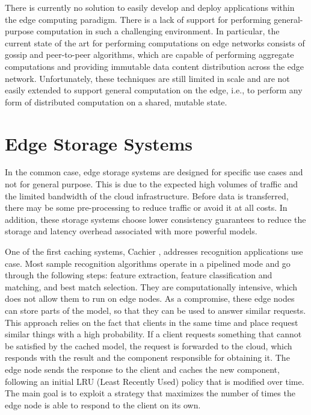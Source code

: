 There is currently no solution to easily develop and deploy applications within the edge computing paradigm. There is a lack of support for performing general-purpose computation in such a challenging environment. In particular, the current state of the art for performing computations on edge networks consists of gossip and peer-to-peer algorithms, which are capable of performing aggregate computations and providing immutable data content distribution across the edge network. Unfortunately, these techniques are still limited in scale and are not easily extended to support general computation on the edge, i.e., to perform any form of distributed computation on a shared, mutable state.

\section{Edge Storage Systems}
\label{sec:edge-storage-systems}
In the common case,
edge storage systems are designed for specific use cases \cite{byers2017openfog}
and not for general purpose.
This is due to the expected high volumes of traffic and the limited bandwidth 
of the cloud infrastructure.
Before data is transferred, there may be some pre-processing to reduce traffic 
or avoid it at all costs.
In addition, these storage systems choose lower consistency guarantees to 
reduce the storage and latency overhead associated with more powerful models.

One of the first caching systems, Cachier \cite{drolia2017cachier},
addresses recognition applications use case.
Most sample recognition algorithms operate in a pipelined mode and go through 
the following steps: 
feature extraction, feature classification and matching, 
and best match selection. 
They are computationally intensive, 
which does not allow them to run on edge nodes. 
As a compromise, these edge nodes can store parts of the model, 
so that they can be used to answer similar requests. 
This approach relies on the fact that clients in the same time and place request
similar things with a high probability. 
If a client requests something that cannot be satisfied by the cached model, 
the request is forwarded to the cloud, which responds with the result and the 
component responsible for obtaining it. The edge node sends the response to the 
client and caches the new component, 
following an initial LRU (Least Recently Used) policy that is modified over 
time. 
The main goal is to exploit a strategy that maximizes the number of times the 
edge node is able to respond to the client on its own.

